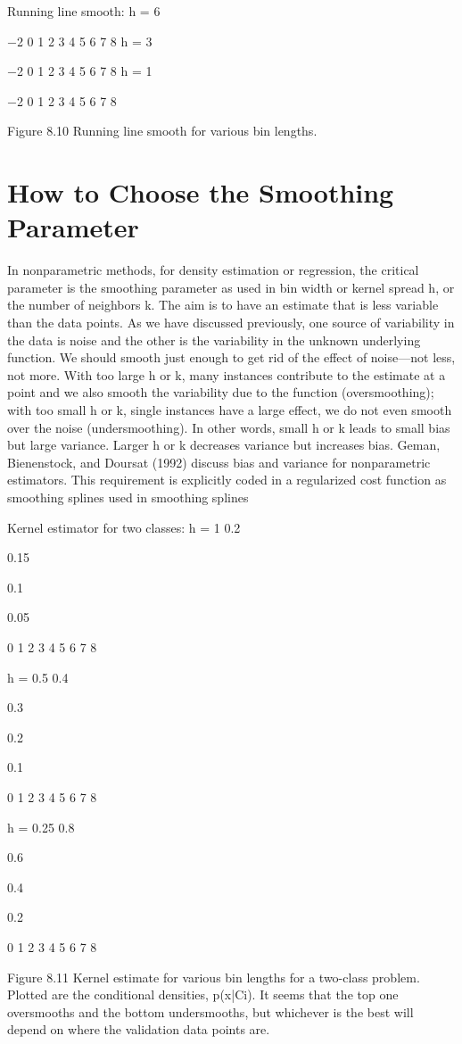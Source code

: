 Running line smooth: h = 6

$-$2 0 1 2 3 4 5 6 7 8 h = 3

$-$2 0 1 2 3 4 5 6 7 8 h = 1

$-$2 0 1 2 3 4 5 6 7 8

Figure 8.10 Running line smooth for various bin lengths.

\section{How to Choose the Smoothing Parameter}

In nonparametric methods, for density estimation or regression, the critical parameter is the smoothing parameter as used in bin width or kernel spread h, or the number of neighbors k. The aim is to have an estimate that is less variable than the data points. As we have discussed previously, one source of variability in the data is noise and the other is the variability in the unknown underlying function. We should smooth just enough to get rid of the effect of noise---not less, not more. With too large h or k, many instances contribute to the estimate at a point and we also smooth the variability due to the function (oversmoothing); with too small h or k, single instances have a large effect, we do not even smooth over the noise (undersmoothing). In other words, small h or k leads to small bias but large variance. Larger h or k decreases variance but increases bias. Geman, Bienenstock, and Doursat (1992) discuss bias and variance for nonparametric estimators. This requirement is explicitly coded in a regularized cost function as smoothing splines used in smoothing splines

Kernel estimator for two classes: h = 1 0.2

0.15

0.1

0.05

0 1 2 3 4 5 6 7 8

h = 0.5 0.4

0.3

0.2

0.1

0 1 2 3 4 5 6 7 8

h = 0.25 0.8

0.6

0.4

0.2

0 1 2 3 4 5 6 7 8

Figure 8.11 Kernel estimate for various bin lengths for a two-class problem. Plotted are the conditional densities, p(x|Ci). It seems that the top one oversmooths and the bottom undersmooths, but whichever is the best will depend on where the validation data points are.

